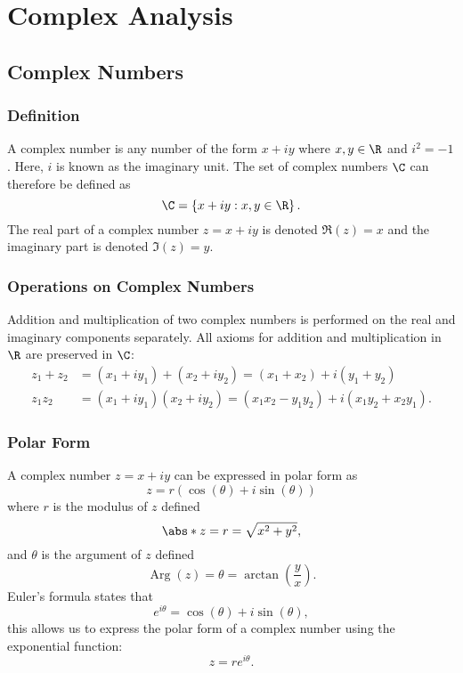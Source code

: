 \documentclass{article}
\DeclareMathOperator{\Arg}{Arg}
\begin{document}
\section{Complex Analysis}
\subsection{Complex Numbers}
\subsubsection{Definition}
A complex number is any number of the form \(x + i y\) where \(x,y \in
\R\) and \(i^2 = -1\). Here, \(i\) is known as the imaginary unit. The
set of complex numbers \(\C\) can therefore be defined as
\begin{equation*}
    \C = \left\{ x + i y : x,y \in \R \right\}.
\end{equation*}
The real part of a complex number \(z = x + i y\) is denoted
\(\Re\left( z \right) = x\) and the imaginary part is denoted
\(\Im\left( z \right) = y\).
\subsubsection{Operations on Complex Numbers}
Addition and multiplication of two complex numbers is performed on the
real and imaginary components separately. All axioms for addition and
multiplication in \(\R\) are preserved in \(\C\):
\begin{align*}
    z_1 + z_2 & = \left( x_1 + i y_1 \right) + \left( x_2 + i y_2 \right) = \left( x_1 + x_2 \right) + i \left( y_1 + y_2 \right)                \\
    z_1 z_2   & = \left( x_1 + i y_1 \right) \left( x_2 + i y_2 \right) = \left( x_1 x_2 - y_1 y_2 \right) + i \left( x_1 y_2 + x_2 y_1 \right).
\end{align*}
\subsubsection{Polar Form}
A complex number \(z = x + i y\) can be expressed in polar form as
\begin{equation*}
    z = r \left( \cos{\left( \theta \right)} + i \sin{\left( \theta \right)} \right)
\end{equation*}
where \(r\) is the modulus of \(z\) defined
\begin{equation*}
    \abs*{z} = r = \sqrt{x^2 + y^2},
\end{equation*}
and \(\theta\) is the argument of \(z\) defined
\begin{equation*}
    \Arg\left( z \right) = \theta = \arctan{\left( \frac{y}{x} \right)}.
\end{equation*}
Euler's formula states that
\begin{equation*}
    e^{i \theta} = \cos{\left( \theta \right)} + i \sin{\left( \theta \right)},
\end{equation*}
this allows us to express the polar form of a complex number using the
exponential function:
\begin{equation*}
    z = r e^{i \theta}.
\end{equation*}
\end{document}
